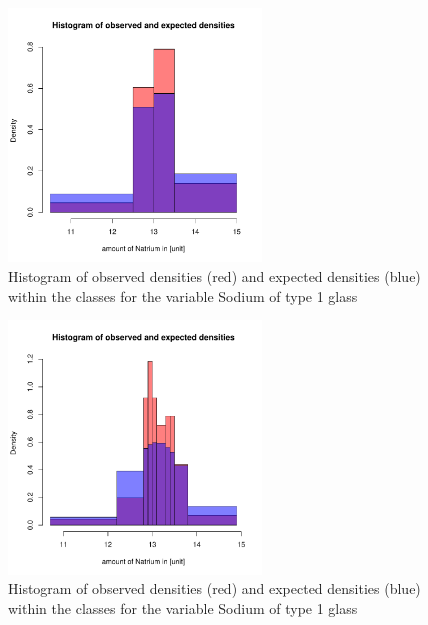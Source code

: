 \documentclass[a4paper, 12pt, titlepage, headsepline, listof = totoc, bibliography = totoc, numbers = noenddot]{scrartcl}
\begin{document}
\begin{appendix}
\begin{figure}[h!]
\centering
\includegraphics[width=0.6\textwidth]{report-chisqType2Na}
\caption{Histogram of observed densities (red) and expected densities (blue) within the classes for the variable Sodium of type 1 glass}
\label{fig:1}
\end{figure}

\begin{figure}[h!]
\centering
\includegraphics[width=0.6\textwidth]{report-chisqType2Na-30}
\caption{Histogram of observed densities (red) and expected densities (blue) within the classes for the variable Sodium of type 1 glass}
\label{fig:2}
\end{figure}


\end{appendix}
\end{document}
